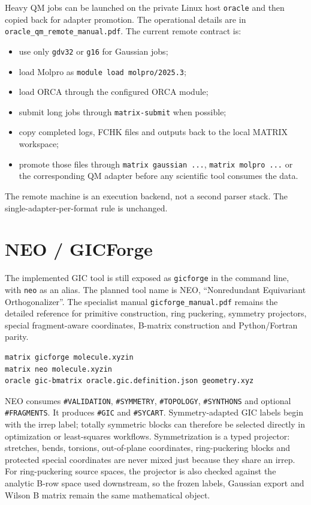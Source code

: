 \documentclass[11pt]{article}
\newcommand{\sectionname}[1]{\texttt{\##1}}
\begin{document}
Heavy QM jobs can be launched on the private Linux host \texttt{oracle} and
then copied back for adapter promotion.  The operational details are in
\texttt{oracle\_qm\_remote\_manual.pdf}.  The current remote contract is:

\begin{itemize}
  \item use only \texttt{gdv32} or \texttt{g16} for Gaussian jobs;
  \item load Molpro as \texttt{module load molpro/2025.3};
  \item load ORCA through the configured ORCA module;
  \item submit long jobs through \texttt{matrix-submit} when possible;
  \item copy completed logs, FCHK files and outputs back to the local MATRIX
        workspace;
  \item promote those files through \texttt{matrix gaussian ...},
        \texttt{matrix molpro ...} or the corresponding QM adapter before any
        scientific tool consumes the data.
\end{itemize}

The remote machine is an execution backend, not a second parser stack.  The
single-adapter-per-format rule is unchanged.

\section{NEO / GICForge}

The implemented GIC tool is still exposed as \texttt{gicforge} in the command
line, with \texttt{neo} as an alias.  The planned tool name is NEO,
``Nonredundant Equivariant Orthogonalizer''.  The specialist manual
\texttt{gicforge\_manual.pdf} remains the detailed reference for primitive
construction, ring puckering, symmetry projectors, special fragment-aware
coordinates, B-matrix construction and Python/Fortran parity.

\begin{lstlisting}[style=matrix]
matrix gicforge molecule.xyzin
matrix neo molecule.xyzin
oracle gic-bmatrix oracle.gic.definition.json geometry.xyz
\end{lstlisting}

NEO consumes \sectionname{VALIDATION}, \sectionname{SYMMETRY},
\sectionname{TOPOLOGY}, \sectionname{SYNTHONS} and optional
\sectionname{FRAGMENTS}.  It produces \sectionname{GIC} and
\sectionname{SYCART}.  Symmetry-adapted GIC labels begin with the irrep label;
totally symmetric blocks can therefore be selected directly in optimization or
least-squares workflows.  Symmetrization is a typed projector: stretches,
bends, torsions, out-of-plane coordinates, ring-puckering blocks and protected
special coordinates are never mixed just because they share an irrep.  For
ring-puckering source spaces, the projector is also checked against the
analytic B-row space used downstream, so the frozen labels, Gaussian export and
Wilson B matrix remain the same mathematical object.
\end{document}
